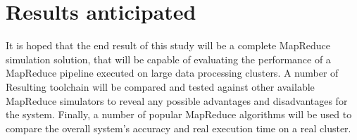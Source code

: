 \documentclass[conference]{IEEEtran} \IEEEoverridecommandlockouts
\begin{document}
    \section{Results anticipated}

    It is hoped that the end result of this study will be a complete MapReduce simulation solution, that will be capable of evaluating the performance of a MapReduce pipeline executed on large data processing clusters. A number of Resulting toolchain will be compared and tested against other available MapReduce simulators to reveal any possible advantages and disadvantages for the system. Finally, a number of popular MapReduce algorithms will be used to compare the overall system's accuracy and real execution time on a real cluster. 

    \printbibliography
\end{document}
